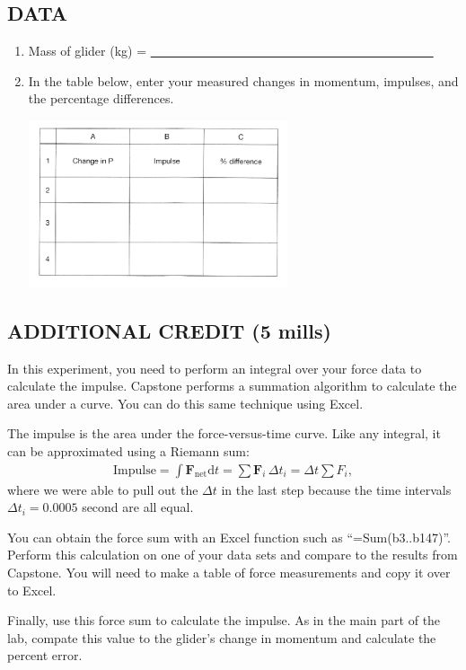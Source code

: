 \subsection*{DATA}

\begin{enumerate}[start=2]

\item Mass of glider (kg) = \ul{~~~~~~~~~~~~~~~~~~~~~~~~~~~~~~~~~~~~~~~~~~~~~}

\setcounter{enumi}{11}
\item In the table below, enter your measured changes in momentum, impulses, and the percentage differences.
\begin{center} \includegraphics*[width=0.6\textwidth]{imgs/6labs/6Alab/6Aexp5/M_Itable_sm.png} \end{center}

\end{enumerate}

\subsection*{ADDITIONAL CREDIT (5 mills)}

In this experiment, you need to perform an integral over your force data to calculate the impulse.
Capstone performs a summation algorithm to calculate the area under a curve.  You can do this same technique using Excel.  

The impulse is the area under the force-versus-time curve.  
Like any integral, it can be approximated using a Riemann sum:
\begin{align*} \textrm{Impulse}=\int \textbf{F}_{\textrm{net}} \textrm{d}t = \sum \textbf{F}_i \,\Delta t_i = \Delta t \sum F_i, \end{align*}
where we were able to pull out the $\Delta t$ in the last step 
because the time intervals \(\Delta t_i = 0.0005\) second are all equal.  

You can obtain the force sum with an Excel function such as ``=Sum(b3..b147)''.  Perform this calculation on one of your data sets and compare to the results from Capstone.  You will need to make a table of force measurements and copy it over to Excel.  

Finally, use this force sum to calculate the impulse.  As in the main part of the lab, compate this value to the glider's change in momentum and calculate the percent error.
